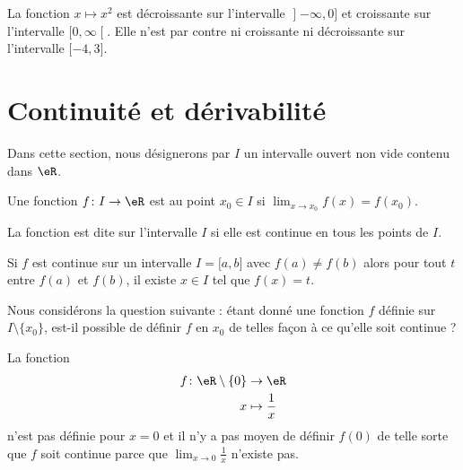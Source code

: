 \begin{example}
    La fonction \( x\mapsto x^2\) est décroissante sur l'intervalle \( \mathopen] -\infty , 0 \mathclose]\) et croissante sur l'intervalle \( \mathopen[ 0 , \infty \mathclose[\). Elle n'est par contre ni croissante ni décroissante sur l'intervalle \( \mathopen[ -4 , 3 \mathclose]\).
\end{example}



\section{Continuité et dérivabilité}
Dans cette section, nous désignerons par \( I\) un intervalle ouvert non vide contenu dans $\eR$.

\begin{definition}
    Une fonction \( f\colon I\to \eR\) est  au point \( x_0\in I\) si \( \lim_{x\to x_0} f(x)=f(x_0)\).

    La fonction est dite  sur l'intervalle \( I\) si elle est continue en tous les points de \( I\).
\end{definition}

\begin{theorem}    \label{ThoLEPooJxGXSN}
    Si \( f\) est continue sur un intervalle \( I=\mathopen[ a , b \mathclose]\) avec \( f(a)\neq f(b)\) alors pour tout \( t\) entre \(f(a)\) et \(f(b)\), il existe \( x\in I\) tel que \( f(x)=t\).
\end{theorem}

Nous considérons la question suivante : étant donné une fonction \( f\) définie sur \( I\setminus\{ x_0 \}\), est-il possible de définir \( f\) en \( x_0\) de telles façon à ce qu'elle soit continue ?

\begin{example}
    La fonction
    \begin{equation}
        \begin{aligned}
            f\colon \eR\setminus\{ 0 \}&\to \eR \\
            x&\mapsto \frac{1}{ x } 
        \end{aligned}
    \end{equation}
    n'est pas définie pour \( x=0\) et il n'y a pas moyen de définir \( f(0)\) de telle sorte que \( f\) soit continue parce que \( \lim_{x\to 0} \frac{1}{ x }\) n'existe pas.
\end{example}

